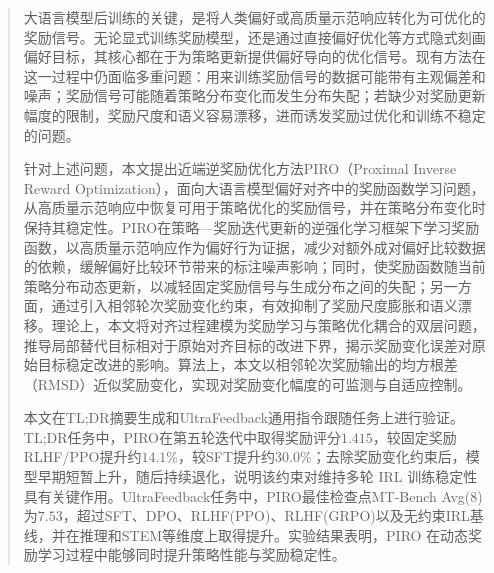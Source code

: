 
\begin{abstract}
大语言模型后训练的关键，是将人类偏好或高质量示范响应转化为可优化的奖励信号。无论显式训练奖励模型，还是通过直接偏好优化等方式隐式刻画偏好目标，其核心都在于为策略更新提供偏好导向的优化信号。现有方法在这一过程中仍面临多重问题：用来训练奖励信号的数据可能带有主观偏差和噪声；奖励信号可能随着策略分布变化而发生分布失配；若缺少对奖励更新幅度的限制，奖励尺度和语义容易漂移，进而诱发奖励过优化和训练不稳定的问题。

针对上述问题，本文提出近端逆奖励优化方法PIRO（Proximal Inverse Reward Optimization），面向大语言模型偏好对齐中的奖励函数学习问题，从高质量示范响应中恢复可用于策略优化的奖励信号，并在策略分布变化时保持其稳定性。PIRO在策略—奖励迭代更新的逆强化学习框架下学习奖励函数，以高质量示范响应作为偏好行为证据，减少对额外成对偏好比较数据的依赖，缓解偏好比较环节带来的标注噪声影响；同时，使奖励函数随当前策略分布动态更新，以减轻固定奖励信号与生成分布之间的失配；另一方面，通过引入相邻轮次奖励变化约束，有效抑制了奖励尺度膨胀和语义漂移。理论上，本文将对齐过程建模为奖励学习与策略优化耦合的双层问题，推导局部替代目标相对于原始对齐目标的改进下界，揭示奖励变化误差对原始目标稳定改进的影响。算法上，本文以相邻轮次奖励输出的均方根差（RMSD）近似奖励变化，实现对奖励变化幅度的可监测与自适应控制。

本文在TL;DR摘要生成和UltraFeedback通用指令跟随任务上进行验证。TL;DR任务中，PIRO在第五轮迭代中取得奖励评分$1.415$，较固定奖励RLHF/PPO提升约$14.1\%$，较SFT提升约$30.0\%$；去除奖励变化约束后，模型早期短暂上升，随后持续退化，说明该约束对维持多轮 IRL 训练稳定性具有关键作用。UltraFeedback任务中，PIRO最佳检查点MT-Bench Avg(8)为$7.53$，超过SFT、DPO、RLHF(PPO)、RLHF(GRPO)以及无约束IRL基线，并在推理和STEM等维度上取得提升。实验结果表明，PIRO 在动态奖励学习过程中能够同时提升策略性能与奖励稳定性。

\end{abstract}

